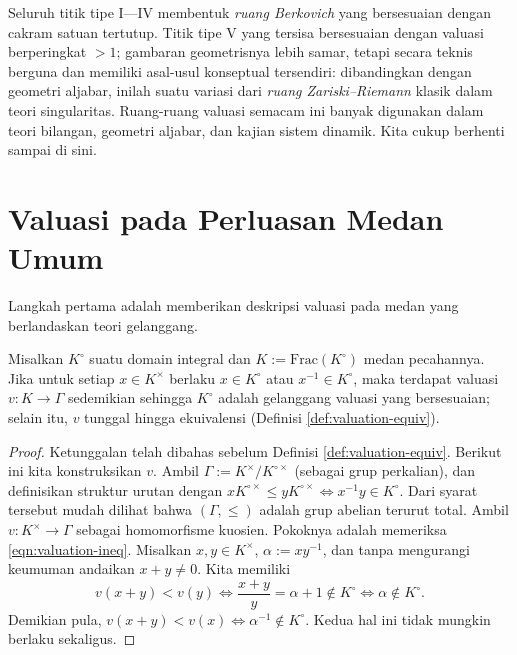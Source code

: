 Seluruh titik tipe I---IV membentuk \emph{ruang Berkovich} yang bersesuaian dengan cakram satuan tertutup. Titik tipe V yang tersisa bersesuaian dengan valuasi berperingkat $> 1$; gambaran geometrisnya lebih samar, tetapi secara teknis berguna dan memiliki asal-usul konseptual tersendiri: dibandingkan dengan geometri aljabar, inilah suatu variasi dari \emph{ruang Zariski--Riemann} klasik dalam teori singularitas. Ruang-ruang valuasi semacam ini banyak digunakan dalam teori bilangan, geometri aljabar, dan kajian sistem dinamik. Kita cukup berhenti sampai di sini.

\section{Valuasi pada Perluasan Medan Umum}\label{sec:valuation-ext-1}
Langkah pertama adalah memberikan deskripsi valuasi pada medan yang berlandaskan teori gelanggang.

\begin{proposition}\label{prop:valuation-ring}
	Misalkan $K^\circ$ suatu domain integral dan $K := \mathrm{Frac}(K^\circ)$ medan pecahannya. Jika untuk setiap $x \in K^\times$ berlaku $x \in K^\circ$ atau $x^{-1} \in K^\circ$, maka terdapat valuasi $v: K \to \Gamma$ sedemikian sehingga $K^\circ$ adalah gelanggang valuasi yang bersesuaian; selain itu, $v$ tunggal hingga ekuivalensi (Definisi \ref{def:valuation-equiv}).
\end{proposition}
\begin{proof}
	Ketunggalan telah dibahas sebelum Definisi \ref{def:valuation-equiv}. Berikut ini kita konstruksikan $v$. Ambil $\Gamma := K^\times/K^{\circ\times}$ (sebagai grup perkalian), dan definisikan struktur urutan dengan $x K^{\circ\times} \leq y K^{\circ\times} \iff x^{-1}y \in K^\circ$. Dari syarat tersebut mudah dilihat bahwa $(\Gamma, \leq)$ adalah grup abelian terurut total. Ambil $v: K^\times \to \Gamma$ sebagai homomorfisme kuosien. Pokoknya adalah memeriksa \eqref{eqn:valuation-ineq}. Misalkan $x,y \in K^\times$, $\alpha := xy^{-1}$, dan tanpa mengurangi keumuman andaikan $x+y \neq 0$. Kita memiliki
	\[ v(x+y) < v(y) \iff \frac{x+y}{y} = \alpha + 1 \notin K^\circ \iff \alpha \notin K^\circ. \]
	Demikian pula, $v(x+y) < v(x) \iff \alpha^{-1} \notin K^\circ$. Kedua hal ini tidak mungkin berlaku sekaligus.
\end{proof}

